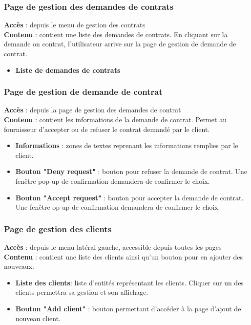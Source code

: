 \documentclass[../rapport.tex]{subfiles}
\begin{document}
\subsubsection{Page de gestion des demandes de contrats}
\noindent \textbf{Accès} : depuis le menu de gestion des contrats  \\
\textbf{Contenu }: contient une liste des demandes de contrats. En cliquant sur la demande on contrat, l'utilisateur arrive sur la page de gestion de demande de contrat.
\begin{itemize}
    \item \textbf{Liste de demandes de contrats}
\end{itemize}

\subsubsection{Page de gestion de demande de contrat}
\noindent \textbf{Accès} : depuis la page de gestion des demandes de contrat \\
\textbf{Contenu }: contient les informations de la demande de contrat. Permet au fournisseur d'accepter ou de refuser le contrat demandé par le client.
\begin{itemize}
    \item \textbf{Informations} : zones de textes reprenant les informations remplies par le client.
    \item \textbf{Bouton "Deny request"} : bouton pour refuser la demande de contrat. Une fenêtre pop-up de confirmation demandera de confirmer le choix.
    \item \textbf{Bouton "Accept request"} : bouton pour accepter la demande de contrat. Une fenêtre op-up de confirmation demandera de confirmer le choix.
\end{itemize}

\subsubsection{Page de gestion des clients}
\noindent \textbf{Accès} : depuis le menu latéral gauche, accessible depuis toutes les pages \\
\textbf{Contenu }: contient une liste des clients ainsi qu'un bouton pour en ajouter des nouveaux.
\begin{itemize}
    \item \textbf{Liste des clients}: liste d'entités représentant les clients. Cliquer sur un des clients permettra sa gestion et son affichage.
    \item \textbf{Bouton "Add client"} : bouton permettant d'accéder à la page d'ajout de nouveau client.
\end{itemize}
\end{document}
